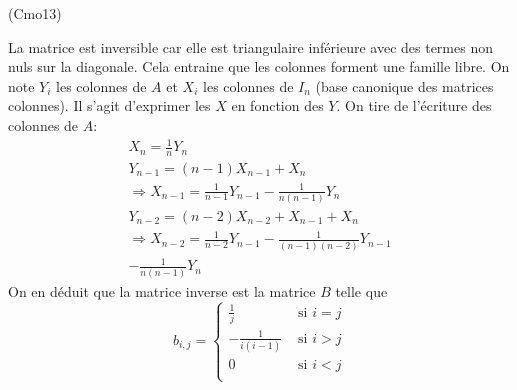 \begin{tiny}(Cmo13)\end{tiny} La matrice est inversible car elle est triangulaire inférieure avec des termes non nuls sur la diagonale. Cela entraine que les colonnes forment une famille libre.\newline
On note $Y_i$ les colonnes de $A$ et $X_i$ les colonnes de $I_n$ (base canonique des matrices colonnes). Il s'agit d'exprimer les $X$ en fonction des $Y$. On tire de l'écriture des colonnes de $A$:
\begin{multline*}
 X_n=\frac{1}{n} Y_n\\
Y_{n-1}=(n-1)X_{n-1}+X_n\\
\Rightarrow X_{n-1}=\frac{1}{n-1}Y_{n-1}-\frac{1}{n(n-1)}Y_{n}\\
Y_{n-2}=(n-2)X_{n-2}+X_{n-1}+X_n\\
\Rightarrow X_{n-2}=\frac{1}{n-2}Y_{n-1}-\frac{1}{(n-1)(n-2)}Y_{n-1}\\-\frac{1}{n(n-1)}Y_{n}
\end{multline*}
 On en déduit que la matrice inverse est la matrice $B$ telle que
\begin{displaymath}
 b_{i,j}=
\left\lbrace 
\begin{aligned}
 \frac{1}{j} &\text{ si }i=j\\
 -\frac{1}{i(i-1)} &\text{ si }i>j\\
 0 &\text{ si }i<j\\
\end{aligned}
\right. 
\end{displaymath}
